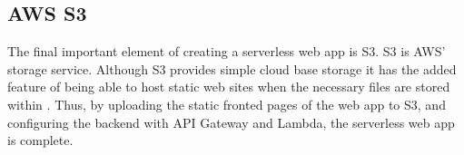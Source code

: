   \subsection{AWS S3}
  The final important element of creating a serverless web app is S3. S3 is AWS' storage service. Although S3 provides simple cloud base storage it has the added feature of being able to host static web sites when the necessary files are stored within \citep{awsWebHosting}. Thus, by uploading the static fronted pages of the web app to S3, and configuring the backend with API Gateway and Lambda, the serverless web app is complete.
  